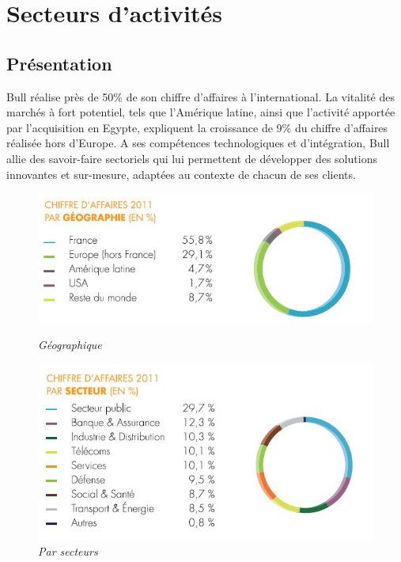 \documentclass[11pt]{article}
\begin{document}
	\section{Secteurs d'activités}
		\subsection{Présentation}
		Bull réalise près de 50\% de son chiffre d'affaires à l'international. La vitalité des marchés à fort potentiel, tels 
		que l'Amérique latine, ainsi que l'activité apportée par l'acquisition en Egypte, expliquent la croissance de 9\% du chiffre 
		d'affaires réalisée hors d'Europe. \newline
		A ses compétences technologiques et d'intégration, Bull allie des savoir-faire sectoriels qui lui permettent de développer 
		des solutions innovantes et sur-mesure, adaptées au contexte de chacun de ses clients.
		\newpage
		\begin{figure}[h!]
		\begin{minipage}[b]{0.5\linewidth}
		\centering \includegraphics[scale=0.5]{profil2012_ca_repartition_fr.jpg}
		\caption{\it Géographique}
		\end{minipage}\hfill
		\begin{minipage}[b]{0.5\linewidth}
		\centering \includegraphics[scale=0.5]{profil2012_ca_repartitionsecteur_fr.jpg}
		\caption{\it Par secteurs}
		\end{minipage}
		\end{figure}
\end{document}
